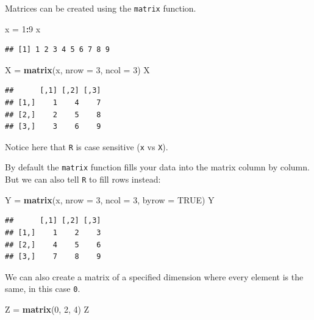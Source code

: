 \documentclass[]{book}
\newenvironment{Shaded}{\begin{snugshade}}{\end{snugshade}}
\newcommand{\KeywordTok}[1]{\textcolor[rgb]{0.13,0.29,0.53}{\textbf{#1}}}
\newcommand{\DataTypeTok}[1]{\textcolor[rgb]{0.13,0.29,0.53}{#1}}
\newcommand{\DecValTok}[1]{\textcolor[rgb]{0.00,0.00,0.81}{#1}}
\newcommand{\StringTok}[1]{\textcolor[rgb]{0.31,0.60,0.02}{#1}}
\newcommand{\OtherTok}[1]{\textcolor[rgb]{0.56,0.35,0.01}{#1}}
\newcommand{\OperatorTok}[1]{\textcolor[rgb]{0.81,0.36,0.00}{\textbf{#1}}}
\newcommand{\NormalTok}[1]{#1}
\begin{document}
Matrices can be created using the \texttt{matrix} function.

\begin{Shaded}
\begin{Highlighting}[]
\NormalTok{x =}\StringTok{ }\DecValTok{1}\OperatorTok{:}\DecValTok{9}
\NormalTok{x}
\end{Highlighting}
\end{Shaded}

\begin{verbatim}
## [1] 1 2 3 4 5 6 7 8 9
\end{verbatim}

\begin{Shaded}
\begin{Highlighting}[]
\NormalTok{X =}\StringTok{ }\KeywordTok{matrix}\NormalTok{(x, }\DataTypeTok{nrow =} \DecValTok{3}\NormalTok{, }\DataTypeTok{ncol =} \DecValTok{3}\NormalTok{)}
\NormalTok{X}
\end{Highlighting}
\end{Shaded}

\begin{verbatim}
##      [,1] [,2] [,3]
## [1,]    1    4    7
## [2,]    2    5    8
## [3,]    3    6    9
\end{verbatim}

Notice here that \texttt{R} is case sensitive (\texttt{x} vs
\texttt{X}).

By default the \texttt{matrix} function fills your data into the matrix
column by column. But we can also tell \texttt{R} to fill rows instead:

\begin{Shaded}
\begin{Highlighting}[]
\NormalTok{Y =}\StringTok{ }\KeywordTok{matrix}\NormalTok{(x, }\DataTypeTok{nrow =} \DecValTok{3}\NormalTok{, }\DataTypeTok{ncol =} \DecValTok{3}\NormalTok{, }\DataTypeTok{byrow =} \OtherTok{TRUE}\NormalTok{)}
\NormalTok{Y}
\end{Highlighting}
\end{Shaded}

\begin{verbatim}
##      [,1] [,2] [,3]
## [1,]    1    2    3
## [2,]    4    5    6
## [3,]    7    8    9
\end{verbatim}

We can also create a matrix of a specified dimension where every element
is the same, in this case \texttt{0}.

\begin{Shaded}
\begin{Highlighting}[]
\NormalTok{Z =}\StringTok{ }\KeywordTok{matrix}\NormalTok{(}\DecValTok{0}\NormalTok{, }\DecValTok{2}\NormalTok{, }\DecValTok{4}\NormalTok{)}
\NormalTok{Z}
\end{Highlighting}
\end{Shaded}
\end{document}
